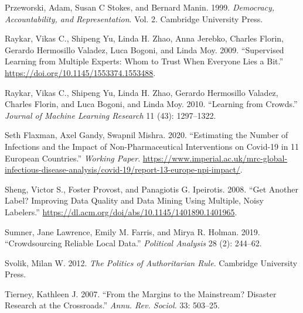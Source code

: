\documentclass[]{article}
\begin{document}
\leavevmode\hypertarget{ref-przeworski1999democracy}{}%
Przeworski, Adam, Susan C Stokes, and Bernard Manin. 1999. \emph{Democracy, Accountability, and Representation}. Vol. 2. Cambridge University Press.

\leavevmode\hypertarget{ref-Raykar2009}{}%
Raykar, Vikas C., Shipeng Yu, Linda H. Zhao, Anna Jerebko, Charles Florin, Gerardo Hermosillo Valadez, Luca Bogoni, and Linda Moy. 2009. ``Supervised Learning from Multiple Experts: Whom to Trust When Everyone Lies a Bit.'' \url{https://doi.org/10.1145/1553374.1553488}.

\leavevmode\hypertarget{ref-Raykar2010}{}%
Raykar, Vikas C., Shipeng Yu, Linda H. Zhao, Gerardo Hermosillo Valadez, Charles Florin, and Luca Bogoni, and Linda Moy. 2010. ``Learning from Crowds.'' \emph{Journal of Machine Learning Research} 11 (43): 1297--1322.

\leavevmode\hypertarget{ref-flaxman2020}{}%
Seth Flaxman, Axel Gandy, Swapnil Mishra. 2020. ``Estimating the Number of Infections and the Impact of Non-Pharmaceutical Interventions on Covid-19 in 11 European Countries.'' \emph{Working Paper}. \url{https://www.imperial.ac.uk/mrc-global-infectious-disease-analysis/covid-19/report-13-europe-npi-impact/}.

\leavevmode\hypertarget{ref-Sheng2008}{}%
Sheng, Victor S., Foster Provost, and Panagiotis G. Ipeirotis. 2008. ``Get Another Label? Improving Data Quality and Data Mining Using Multiple, Noisy Labelers.'' \url{https://dl.acm.org/doi/abs/10.1145/1401890.1401965}.

\leavevmode\hypertarget{ref-sumneretal2019}{}%
Sumner, Jane Lawrence, Emily M. Farris, and Mirya R. Holman. 2019. ``Crowdsourcing Reliable Local Data.'' \emph{Political Analysis} 28 (2): 244--62.

\leavevmode\hypertarget{ref-svolik2012politics}{}%
Svolik, Milan W. 2012. \emph{The Politics of Authoritarian Rule}. Cambridge University Press.

\leavevmode\hypertarget{ref-tierney2007margins}{}%
Tierney, Kathleen J. 2007. ``From the Margins to the Mainstream? Disaster Research at the Crossroads.'' \emph{Annu. Rev. Sociol.} 33: 503--25.
\end{document}
